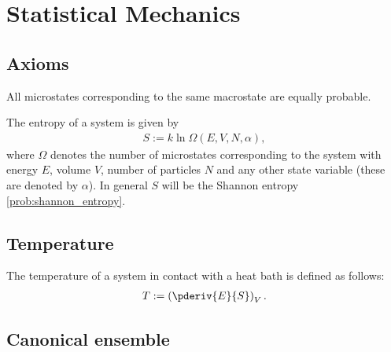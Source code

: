 \chapter{Statistical Mechanics}

\section{Axioms}

    \begin{axiom}
        All microstates corresponding to the same macrostate are equally probable.
    \end{axiom}

    \begin{axiom}
        The entropy of a system is given by
        \begin{gather}
            \label{statmech:boltzmann_formula}
            S := k\ln\Omega(E,V,N,\alpha),
        \end{gather}
        where $\Omega$ denotes the number of microstates corresponding to the system with energy $E$, volume $V$, number of particles $N$ and any other state variable (these are denoted by $\alpha$). In general $S$ will be the Shannon entropy \ref{prob:shannon_entropy}.
    \end{axiom}

\section{Temperature}

    \begin{definition}\label{statmech:temperature}
        The temperature of a system in contact with a heat bath is defined as follows:
        \begin{gather}
            T := \left(\pderiv{E}{S}\right)_V.
        \end{gather}
    \end{definition}

\section{Canonical ensemble}



